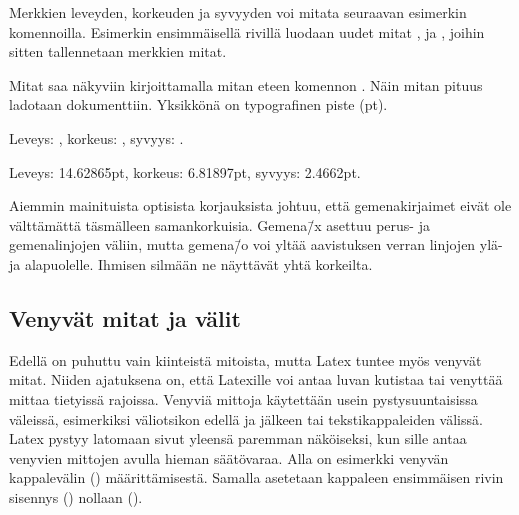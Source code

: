 Merkkien leveyden, korkeuden ja syvyyden voi mitata seuraavan esimerkin
komennoilla. Esimerkin ensimmäisellä rivillä luodaan uudet mitat
,  ja , joihin sitten
tallennetaan merkkien mitat.

\begin{koodilohkosis}
\newlength{\leveys} \newlength{\korkeus} \newlength{\syvyys}
\settowidth{\leveys}{abc} %
\end{koodilohkosis}

\noindent
Mitat saa näkyviin kirjoittamalla mitan eteen komennon .
Näin mitan pituus ladotaan dokumenttiin. Yksikkönä on typografinen piste
(pt).

\begin{koodilohkosis}
Leveys: \the\leveys, korkeus: \the\korkeus, syvyys: \the\syvyys.
\end{koodilohkosis}

\begin{tulossis}
  Leveys: 14.62865pt, korkeus: 6.81897pt, syvyys: 2.4662pt.
\end{tulossis}

\noindent
Aiemmin mainituista optisista korjauksista johtuu, että gemenakirjaimet
eivät ole välttämättä täsmälleen samankorkuisia. Gemena\=/x asettuu
perus- ja gemenalinjojen väliin, mutta gemena\=/o voi yltää aavistuksen
verran linjojen ylä- ja alapuolelle. Ihmisen silmään ne näyttävät yhtä
korkeilta.

\subsection{Venyvät mitat ja välit}
\label{luku/venyvät-mitat}

Edellä on puhuttu vain kiinteistä mitoista, mutta Latex tuntee myös
venyvät mitat. Niiden ajatuksena on, että Latexille voi antaa luvan
kutistaa tai venyttää mittaa tietyissä rajoissa. Venyviä mittoja
käytettään usein pystysuuntaisissa väleissä, esimerkiksi väliotsikon
edellä ja jälkeen tai tekstikappaleiden välissä. Latex pystyy latomaan
sivut yleensä paremman näköiseksi, kun sille antaa venyvien mittojen
avulla hieman säätövaraa. Alla on esimerkki venyvän kappalevälin
() määrittämisestä. Samalla asetetaan kappaleen
ensimmäisen rivin sisennys () nollaan (\koodi{0em}).


